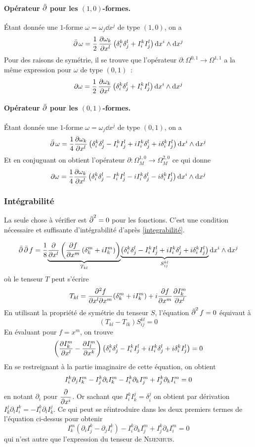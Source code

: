 \documentclass[12pt,draft]{article}
\begin{document}
\paragraph*{Opérateur $\operatorname{\bar{\partial}}$ pour les $(1,0)$-formes.} Étant donnée une $1$-forme $\omega = \omega_j \dd x^j$ de type $(1,0)$, on a
\[
\operatorname{\bar{\partial}} \omega = \operatorname{\frac{1}{2}} \dfrac{\partial{\omega_k}}{\partial{x^l}}\left(\delta^k_i \delta^l_j + I^k_i I^l_j \right) \operatorname{d\!} x^i \wedge \operatorname{d\!} x^j
\]
Pour des raisons de symétrie, il se trouve que l'opérateur $\partial : \Omega^{0,1} \rightarrow \Omega^{1,1}$ a la même expression pour $\omega$ de type $(0,1)$~:
\[
\partial \omega = \operatorname{\frac{1}{2}} \dfrac{\partial{\omega_k}}{\partial{x^l}}\left(\delta^k_i \delta^l_j + I^k_i I^l_j \right) \operatorname{d\!} x^i \wedge \operatorname{d\!} x^j
\]

\paragraph*{Opérateur $\operatorname{\bar{\partial}}$ pour les $(0,1)$-formes.}Étant donnée une $1$-forme $\omega = \omega_j \dd x^j$ de type $(0,1)$, on a
\[
\operatorname{\bar{\partial}} \omega = \dfrac{1}{4} \dfrac{\partial{\omega_k}}{\partial{x^l}}\left( \delta_i^k\delta_j^l - I_i^k I_j^l  + iI_i^k\delta_j^l + i \delta_i^kI_j^l\right) \operatorname{d\!} x^i \wedge \operatorname{d\!} x^j
\]
Et en conjuguant on obtient l'opérateur $\partial : \Omega^{1,0}_M \rightarrow \Omega^{2,0}_M$ ce qui donne
\[
\partial \omega = \dfrac{1}{4} \dfrac{\partial{\omega_k}}{\partial{x^l}}\left( \delta_i^k\delta_j^l - I_i^k I_j^l  - iI_i^k\delta_j^l - i \delta_i^kI_j^l\right) \operatorname{d\!} x^i \wedge \operatorname{d\!} x^j
\]
\subsubsection{Intégrabilité}
La seule chose à vérifier est $\operatorname{\bar{\partial}}^2 = 0$ pour les fonctions. C'est une condition nécessaire et suffisante d'intégrabilité d'après \autoref{integrabilité}.

\[
\operatorname{\bar{\partial}}\operatorname{\bar{\partial}} f = \dfrac{1}{8} \underset{T_{kl}}{\underbrace{\dfrac{\partial{}}{\partial{x^l}}\left(
\dfrac{\partial{f}}{\partial{x^m}}
\left(\delta^m_k + i I^m_k\right)\right)}}\underset{S_{ij}^{kl}}{\underbrace{\left( \delta_i^k\delta_j^l - I_i^k I_j^l  + iI_i^k\delta_j^l + i \delta_i^kI_j^l\right)}} \operatorname{d\!} x^i \wedge \operatorname{d\!} x^j
\]
où le tenseur $T$ peut s'écrire
\[
T_{kl} = \dfrac{\partial^2{f}}{\partial{x^l}\partial{x^m}}(\delta_k^m + i I_k^m) + i \dfrac{\partial{f}}{\partial{x^m}}\dfrac{\partial{I^m_k}}{\partial{x^l}}
\]
En utilisant la propriété de symétrie du tenseur $S$, l'équation $\operatorname{\bar{\partial}}^2 f = 0$ équivaut à
\[
(T_ {kl} - T_{lk})S_{ij}^{kl} = 0
\]
En évaluant pour $f= x^m$, on trouve
\[
\left(
\dfrac{\partial{I^m_k}}{\partial{x^l}} - \dfrac{\partial{I^m_l}}{\partial{x^k}}
\right)\left( \delta_i^k\delta_j^l - I_i^k I_j^l  + iI_i^k\delta_j^l + i \delta_i^kI_j^l\right) = 0
\]
 En se restreignant à la partie imaginaire de cette équation, on obtient
 \[
I_i^k\partial_jI_k^m - I_j^k\partial_i I_k^m - I_i^k\partial_kI^m_j + I_j^k\partial_kI^m_i  = 0\\
\]
en notant $\partial_i$ pour $\dfrac{\partial{}}{\partial{x^i}}$.
Or sachant que $I_i^kI_k^j = \delta_i^j$ on obtient par dérivation $I_k^j \partial_l I_i^k = - I_i^k\partial_l I_k^j$. Ce qui peut se réintroduire dans les deux premiers termes de l'équation ci-dessus pour obtenir
\[
I_k^m (\partial_i I_j^k - \partial_j I_i^k) - I_i^k\partial_kI^m_j + I_j^k\partial_kI^m_i = 0
\]
qui n'est autre que l'expression du tenseur de \textsc{Nijenhuis}.
\end{document}
